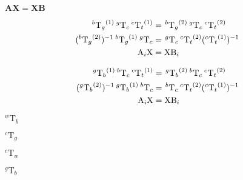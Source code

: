 \documentclass{article}
\begin{document}
$\mathbf{A}\mathbf{X}=\mathbf{X}\mathbf{B}$
\pagebreak

\[ \begin{align*} ^{b}{\textrm{T}_g}^{(1)} \hspace{0.2em} ^{g}\textrm{T}_c \hspace{0.2em} ^{c}{\textrm{T}_t}^{(1)} &= \hspace{0.1em} ^{b}{\textrm{T}_g}^{(2)} \hspace{0.2em} ^{g}\textrm{T}_c \hspace{0.2em} ^{c}{\textrm{T}_t}^{(2)} \\ (^{b}{\textrm{T}_g}^{(2)})^{-1} \hspace{0.2em} ^{b}{\textrm{T}_g}^{(1)} \hspace{0.2em} ^{g}\textrm{T}_c &= \hspace{0.1em} ^{g}\textrm{T}_c \hspace{0.2em} ^{c}{\textrm{T}_t}^{(2)} (^{c}{\textrm{T}_t}^{(1)})^{-1} \\ \textrm{A}_i \textrm{X} &= \textrm{X} \textrm{B}_i \\ \end{align*} \]
\pagebreak

\[ \begin{align*} ^{g}{\textrm{T}_b}^{(1)} \hspace{0.2em} ^{b}\textrm{T}_c \hspace{0.2em} ^{c}{\textrm{T}_t}^{(1)} &= \hspace{0.1em} ^{g}{\textrm{T}_b}^{(2)} \hspace{0.2em} ^{b}\textrm{T}_c \hspace{0.2em} ^{c}{\textrm{T}_t}^{(2)} \\ (^{g}{\textrm{T}_b}^{(2)})^{-1} \hspace{0.2em} ^{g}{\textrm{T}_b}^{(1)} \hspace{0.2em} ^{b}\textrm{T}_c &= \hspace{0.1em} ^{b}\textrm{T}_c \hspace{0.2em} ^{c}{\textrm{T}_t}^{(2)} (^{c}{\textrm{T}_t}^{(1)})^{-1} \\ \textrm{A}_i \textrm{X} &= \textrm{X} \textrm{B}_i \\ \end{align*} \]
\pagebreak

$_{}^{w}\textrm{T}_b$
\pagebreak

$_{}^{c}\textrm{T}_g$
\pagebreak

$_{}^{c}\textrm{T}_w$
\pagebreak

$_{}^{g}\textrm{T}_b$
\pagebreak
\end{document}
